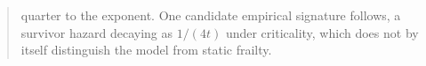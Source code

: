 \begin{abstract}
quarter to the exponent. One candidate empirical signature follows, a survivor hazard decaying as $1/(4t)$ under criticality, which does not by itself distinguish the model from static frailty.
\end{abstract}
